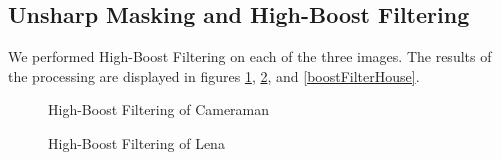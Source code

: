 \documentclass[journal]{IEEEtran}
\begin{document}
\subsection{Unsharp Masking and High-Boost Filtering}
We performed High-Boost Filtering on each of the three images. The results of the processing are displayed in figures \ref{boostFilterCameraman}, \ref{boostFilterLena}, and \ref{boostFilterHouse}.

\begin{figure}[!h]
\centering
{}
\caption{High-Boost Filtering of Cameraman}
\label{boostFilterCameraman}
\end{figure}

\begin{figure}[!h]
\centering
{}
\caption{High-Boost Filtering of Lena}
\label{boostFilterLena}
\end{figure}
\end{document}
